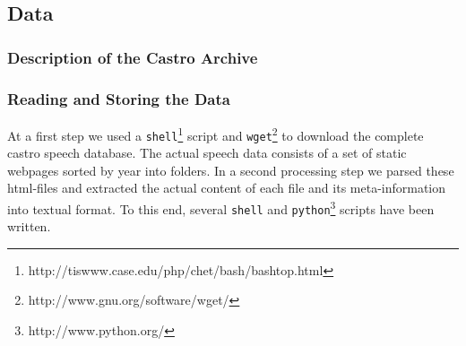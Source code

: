 
\subsection {Data}
\label{sec:data}

\subsubsection{Description of the Castro Archive}
\label{sec:description_of_the_castro_archive}

\subsubsection{Reading and Storing the Data}
\label{sec:reading_and_storing_the_data}

At a first step we used a \texttt{shell}\footnote{http://tiswww.case.edu/php/chet/bash/bashtop.html}
script and \texttt{wget}\footnote{http://www.gnu.org/software/wget/} to download the complete castro
speech database. The actual speech data consists of a set of static webpages sorted by year into
folders. In a second processing step we parsed these html-files and extracted the actual content of
each file and its meta-information into textual format. To this end, several \texttt{shell} and
\texttt{python}\footnote{http://www.python.org/} scripts have been written.

